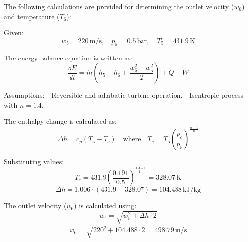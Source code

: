 The following calculations are provided for determining the outlet velocity (\( w_6 \)) and temperature (\( T_6 \)):  

Given:  
\[
w_5 = 220 \, \text{m/s}, \quad p_5 = 0.5 \, \text{bar}, \quad T_5 = 431.9 \, \text{K}
\]

The energy balance equation is written as:  
\[
\frac{dE}{dt} = \dot{m} \left( h_5 - h_6 + \frac{w_6^2 - w_5^2}{2} \right) + \dot{Q} - \dot{W}
\]

Assumptions:  
- Reversible and adiabatic turbine operation.  
- Isentropic process with \( n = 1.4 \).  

The enthalpy change is calculated as:  
\[
\Delta h = c_p (T_5 - T_c) \quad \text{where} \quad T_c = T_5 \left( \frac{p_c}{p_5} \right)^{\frac{n-1}{n}}
\]

Substituting values:  
\[
T_c = 431.9 \left( \frac{0.191}{0.5} \right)^{\frac{1.4-1}{1.4}} = 328.07 \, \text{K}
\]
\[
\Delta h = 1.006 \cdot (431.9 - 328.07) = 104.488 \, \text{kJ/kg}
\]

The outlet velocity (\( w_6 \)) is calculated using:  
\[
w_6 = \sqrt{w_5^2 + \Delta h \cdot 2}
\]
\[
w_6 = \sqrt{220^2 + 104.488 \cdot 2} = 498.79 \, \text{m/s}
\]